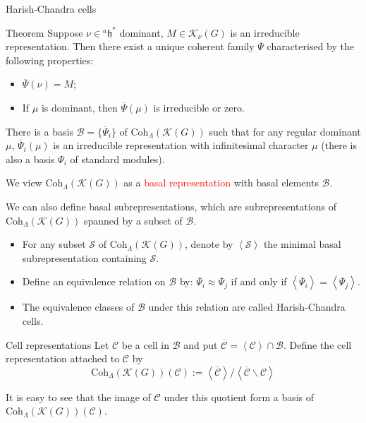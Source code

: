 \documentclass[fleqn,xcolor=dvipsnames]{beamer}
\newcommand{\CB}{{\mathcal {B}}}
\newcommand{\CC}{{\mathcal {C}}}
\newcommand{\CK}{{\mathcal {K}}}
\newcommand{\CS}{{\mathcal {S}}}
\newcommand{\fh}{\mathfrak{h}}
\renewcommand{\bar}{\overline}
\begin{document}
\begin{frame}{Harish-Chandra cells}
  \begin{block}{Theorem}
    Suppose $\nu \in {^{a}\fh}^*$ dominant, $M \in \CK_{\nu}(G)$ is an irreducible representation. Then there exist a unique coherent family $\bar{\Psi}$ characterised by the following properties:
    \begin{itemize}
      \item $\bar{\Psi}(\nu) = M$;
      \item If $\mu$ is dominant, then $\bar{\Psi}(\mu)$ is irreducible or zero.
    \end{itemize}
  \end{block}
  \pause There is a basis $\CB = \{\bar{\Psi}_i\}$ of $\mathrm{Coh}_{\Lambda}(\CK(G))$ such that for any regular dominant $\mu$, $\bar{\Psi}_i(\mu)$ is an irreducible representation with infinitesimal character $\mu$ (there is also a basis $\Psi_i$ of standard modules).\par
  \pause We view $\mathrm{Coh}_{\Lambda}(\CK(G))$ as a \textcolor{red}{basal representation} with basal elements $\CB$.\par
  \pause We can also define basal subrepresentations, which are subrepresentations of $\mathrm{Coh}_{\Lambda}(\CK(G))$ spanned by a subset of $\CB$. 
\end{frame}






\begin{frame}
  \begin{itemize}
    \item For any subset $\CS$ of $\mathrm{Coh}_{\Lambda}(\CK(G))$, denote by $\left \langle \CS \right \rangle$ the minimal basal subrepresentation containing $\CS$.
    \pause\item Define an equivalence relation on $\CB$ by: 
    $\bar{\Psi}_i \approx  \bar{\Psi}_j$ if and only if $\left \langle \bar{\Psi}_i \right \rangle = \left \langle \bar{\Psi}_j \right \rangle$.
    \pause\item The equivalence classes of $\CB$ under this relation are called Harish-Chandra cells.
  \end{itemize}
  
  
  
  \pause\begin{block}{Cell representations}
    Let $\CC$ be a cell in $\CB$ and put $\bar{\CC} = \left \langle \CC \right \rangle \cap \CB$. Define the cell representation attached to $\CC$ by
    \[ \mathrm{Coh}_{\Lambda}(\CK(G))(\CC) := \left \langle \bar{\CC} \right \rangle  / \left \langle \bar{\CC} \backslash \CC \right \rangle\] 
  \end{block}

\pause It is easy to see that the image of $\CC$ under this quotient form a basis of $\mathrm{Coh}_{\Lambda}(\CK(G))(\CC)$.
  
\end{frame}
\end{document}
